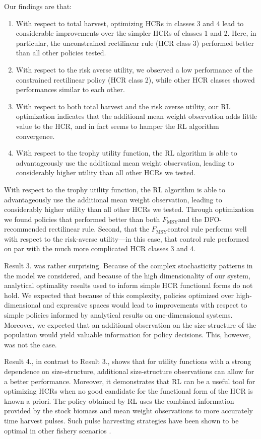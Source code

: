 \documentclass[floatfix,nofootinbib,longbibliography,notitlepage]{revtex4-1}
\def\textfmsy{$F_{\text{MSY}}$}
\begin{document}
Our findings are that:
\begin{enumerate}
\item With respect to total harvest, optimizing HCRs in classes 3 and 4 lead to considerable improvements over the simpler HCRs of classes 1 and 2. Here, in particular, the unconstrained rectilinear rule (HCR class 3) performed better than all other policies tested.
\item With respect to the risk averse utility, we observed a low performance of the constrained rectilinear policy (HCR class 2), while other HCR classes showed performances similar to each other.
\item With respect to both total harvest and the risk averse utility, our RL optimization indicates that the additional mean weight observation adds little value to the HCR, and in fact seems to hamper the RL algorithm convergence. 
\item With respect to the trophy utility function, the RL algorithm is able to advantageously use the additional mean weight observation, leading to considerably higher utility than all other HCRs we tested. 
\end{enumerate}

With respect to the trophy utility function, the RL algorithm is able to advantageously use the additional mean weight observation, leading to considerably higher utility than all other HCRs we tested. 
Through optimization we found policies that performed better than both \textfmsy and the DFO-recommended rectilinear rule. 
Second, that the \textfmsy control rule performs well with respect to the risk-averse utility—in this case, that control rule performed on par with the much more complicated HCR classes 3 and 4. 

Result 3. was rather surprising. 
Because of the complex stochasticity patterns in the model we considered, and because of the high dimensionality of our system, analytical optimality results used to inform simple HCR functional forms do not hold. 
We expected that because of this complexity, policies optimized over high-dimensional and expressive spaces would lead to improvements with respect to simple policies informed by analytical results on one-dimensional systems. 
Moreover, we expected that an additional observation on the size-structure of the population would yield valuable information for policy decisions. 
This, however, was not the case.

Result 4., in contrast to Result 3., shows that for utility functions with a strong dependence on size-structure, additional size-structure observations can allow for a better performance. 
Moreover, it demonstrates that RL can be a useful tool for optimizing HCRs when no good candidate for the functional form of the HCR is known a priori. 
The policy obtained by RL uses the combined information provided by the stock biomass and mean weight observations to more accurately time harvest pulses. Such pulse harvesting strategies have been shown to be optimal in other fishery scenarios \cite{botsford1981,darocha2013}.
\end{document}
